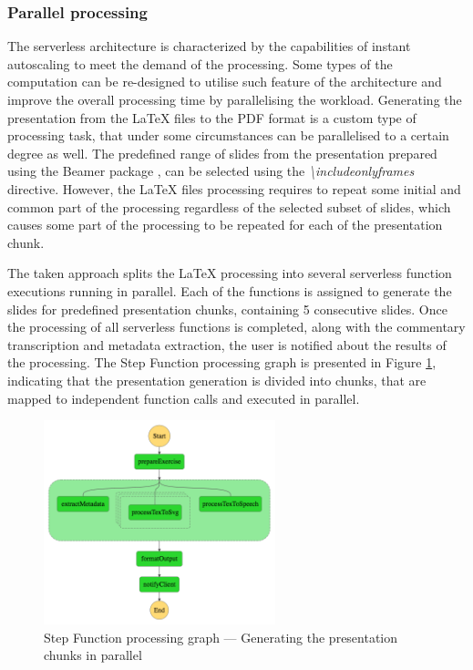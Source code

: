 \subsubsection{Parallel processing} \label{section:case-study-parallel-processing}

The serverless architecture is characterized by the capabilities of instant autoscaling to meet the demand of the processing.
Some types of the computation can be re-designed to utilise such feature of the architecture and improve the overall processing time by parallelising the workload.
Generating the presentation from the LaTeX files to the PDF format is a custom type of processing task, that under some circumstances can be parallelised to a certain degree as well.
The predefined range of slides from the presentation prepared using the Beamer package \cite{beamer}, can be selected using the \textit{\textbackslash includeonlyframes} directive.
However, the LaTeX files processing requires to repeat some initial and common part of the processing regardless of the selected subset of slides, which causes some part of the processing to be repeated for each of the presentation chunk.

The taken approach splits the LaTeX processing into several serverless function executions running in parallel. Each of the functions is assigned to generate the slides for predefined presentation chunks, containing 5 consecutive slides. Once the processing of all serverless functions is completed, along with the commentary transcription and metadata extraction, the user is notified about the results of the processing. The Step Function processing graph is presented in Figure \ref{fig:step-function-processing-the-presentation-in-parallel}, indicating that the presentation generation is divided into chunks, that are mapped to independent function calls and executed in parallel.

\begin{figure}[]
    \centering
    \includegraphics[width=0.6\textwidth]{assets/04-serverless-for-web-apps/stepFunctionGraphParallel.png}
    \caption{Step Function processing graph --- Generating the presentation chunks in parallel}
    \label{fig:step-function-processing-the-presentation-in-parallel}
\end{figure}

